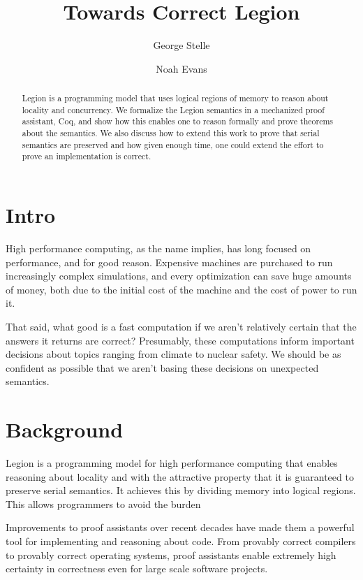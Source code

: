 \documentclass[sigplan]{acmart}
\begin{document}
\title{Towards Correct Legion}
\author{George Stelle}

\author{Noah Evans}

\begin{abstract}
Legion is a programming model that uses logical regions of memory to reason about 
locality and concurrency. We formalize the Legion semantics in a mechanized
proof assistant, Coq, and show how this enables one to reason formally and
prove theorems about the semantics. We also discuss how to extend this work to
prove that serial semantics are preserved and how given enough time, one could
extend the effort to prove an implementation is correct.
\end{abstract}

\maketitle

\section{Intro}
High performance computing, as the name implies, has long focused on
performance, and for good reason. Expensive machines are purchased to run
increasingly complex simulations, and every optimization can save huge amounts
of money, both due to the initial cost of the machine and the cost of power to
run it. 

That said, what good is a fast computation if we aren't relatively certain that
the answers it returns are correct? Presumably, these computations inform
important decisions about topics ranging from climate to nuclear safety. We
should be as confident as possible that we aren't basing these decisions on
unexpected semantics.

\section{Background}

Legion is a programming model for high performance computing that enables
reasoning about locality and with the attractive property that it is guaranteed
to preserve serial semantics. It achieves this by dividing memory into logical
regions.  This allows programmers to avoid the
burden 

Improvements to proof assistants over recent decades have made them a powerful
tool for implementing and reasoning about code. From provably correct compilers
to provably correct operating systems, proof assistants enable extremely high
certainty in correctness even for large scale software projects. 
\end{document}
